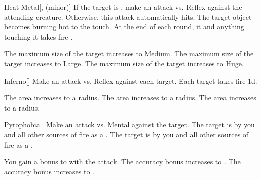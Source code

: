 \lowercase{\hypertarget{spell:Heat Metal}{}}\label{spell:Heat Metal}
\begin{freeability}[Rank 2]{\hypertarget{spell:Heat Metal}{Heat Metal}}[,  (minor)]
If the target is , make an attack vs. Reflex against the attending creature.
Otherwise, this attack automatically hits.
\hit The target object becomes burning hot to the touch.
At the end of each round, it and anything touching it takes fire .

\rankline
{} The maximum size of the target increases to Medium.
 The maximum size of the target increases to Large.
 The maximum size of the target increases to Huge.
\end{freeability}
\vspace{0.25em}



\lowercase{\hypertarget{spell:Inferno}{}}\label{spell:Inferno}
\begin{freeability}[Rank 2]{\hypertarget{spell:Inferno}{Inferno}}[]
Make an attack vs. Reflex against each target.
\hit Each target takes fire  \minus1d.

\rankline
{} The area increases to a \arealarge radius.
 The area increases to a \areahuge radius.
 The area increases to a \areaext radius.
\end{freeability}
\vspace{0.25em}



\lowercase{\hypertarget{spell:Pyrophobia}{}}\label{spell:Pyrophobia}
\begin{freeability}[Rank 2]{\hypertarget{spell:Pyrophobia}{Pyrophobia}}[]
Make an attack vs. Mental against the target.
\hit The target is  by you and all other sources of fire as a .
\crit The target is  by you and all other sources of fire as a .

\rankline
{} You gain a  bonus to  with the attack.
 The accuracy bonus increases to .
 The accuracy bonus increases to .
\end{freeability}
\vspace{0.25em}




